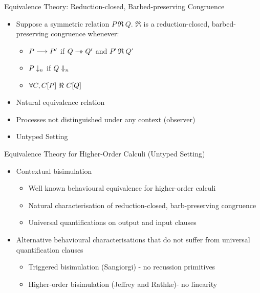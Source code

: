 \documentclass{beamer}
\begin{document}
	\begin{frame}{Equivalence Theory: Reduction-closed, Barbed-preserving Congruence}
		\begin{itemize}
			\item Suppose a symmetric relation $P\ \Re\ Q$. $\Re$ is a reduction-closed, barbed-preserving congruence whenever:
			\begin{itemize}
				\item	$P \longrightarrow P'$ if $Q \rightarrow\!\!\!\!\!\rightarrow Q'$ and $P'\ \Re\ Q'$
				\item	$P \downarrow_{n}$ if $Q \Downarrow_{n}$
				\item	$\forall C, \context{C}{P}\ \Re\ \context{C}{Q}$
			\end{itemize}

			\item	Natural equivalence relation
			\item	Processes not distinguished under any context (observer)
			\item	Untyped Setting
		\end{itemize}
	\end{frame}


	\begin{frame}{Equivalence Theory for Higher-Order Calculi (Untyped Setting)}
		\begin{itemize}
			\item	Contextual bisimulation
				\begin{itemize}
					\item	Well known behavioural equivalence for higher-order calculi
					\item	Natural characterisation of reduction-closed, barb-preserving congruence
					\item	Universal quantifications on output and input clauses
				\end{itemize}


			\item	Alternative behavioural characterisations that do not suffer from universal quantification clauses
				\begin{itemize}
					\item	Triggered bisimulation (Sangiorgi) - no recussion primitives
					\item	Higher-order bisimulation (Jeffrey and Rathke)- no linearity
				\end{itemize}
		\end{itemize}
	\end{frame}
\end{document}

